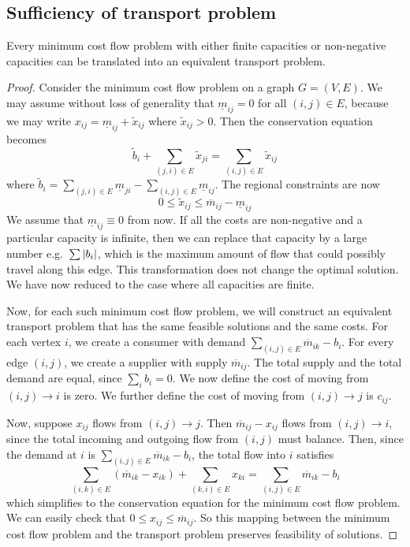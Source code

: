 \subsection{Sufficiency of transport problem}
\begin{theorem}
	Every minimum cost flow problem with either finite capacities or non-negative capacities can be translated into an equivalent transport problem.
\end{theorem}
\begin{proof}
	Consider the minimum cost flow problem on a graph \( G = (V, E) \).
	We may assume without loss of generality that \( \underline m_{ij} = 0 \) for all \( (i,j) \in E \), because we may write \( x_{ij} = \underline m_{ij} + \widetilde x_{ij} \) where \( \widetilde x_{ij} > 0 \).
	Then the conservation equation becomes
	\[
		\widetilde{b}_i + \sum_{(j,i) \in E}\widetilde{x}_{ji} = \sum_{(i,j) \in E}\widetilde{x}_{ij}
	\]
	where \( \widetilde{b}_i = \sum_{(j,i) \in E}\underline{m}_{ji} - \sum_{(i,j) \in E}\underline{m}_{ij} \).
	The regional constraints are now
	\[
		0 \leq \widetilde{x}_{ij} \leq \overline m_{ij} - \underline m_{ij}
	\]
	We assume that \( \underline m_{ij} \equiv 0 \) from now.
	If all the costs are non-negative and a particular capacity is infinite, then we can replace that capacity by a large number e.g.\ \( \sum \abs{b_i} \),
	which is the maximum amount of flow that could possibly travel along this edge.
	This transformation does not change the optimal solution.
	We have now reduced to the case where all capacities are finite.

	Now, for each such minimum cost flow problem, we will construct an equivalent transport problem that has the same feasible solutions and the same costs.
	For each vertex \( i \), we create a consumer with demand \( \sum_{(i,j) \in E} \overline m_{ik} - b_i \).
	For every edge \( (i,j) \), we create a supplier with supply \( \overline m_{ij} \).
	The total supply and the total demand are equal, since \( \sum_i b_i = 0 \).
	We now define the cost of moving from \( (i,j) \to i \) is zero.
	We further define the cost of moving from \( (i,j) \to j \) is \( c_{ij} \).

	Now, suppose \( x_{ij} \) flows from \( (i,j) \to j \).
	Then \( \overline m_{ij} - x_{ij} \) flows from \( (i,j) \to i \), since the total incoming and outgoing flow from \( (i,j) \) must balance.
	Then, since the demand at \( i \) is \( \sum_{(i,j) \in E} \overline m_{ik} - b_i \), the total flow into \( i \) satisfies
	\[
		\sum_{(i,k) \in E} (\overline m_{ik} - x_{ik}) + \sum_{(k,i) \in E} x_{ki} = \sum_{(i,j) \in E} \overline m_{ik} - b_i
	\]
	which simplifies to the conservation equation for the minimum cost flow problem.
	We can easily check that \( 0 \leq x_{ij} \leq \overline m_{ij} \).
	So this mapping between the minimum cost flow problem and the transport problem preserves feasibility of solutions.


\end{proof}
